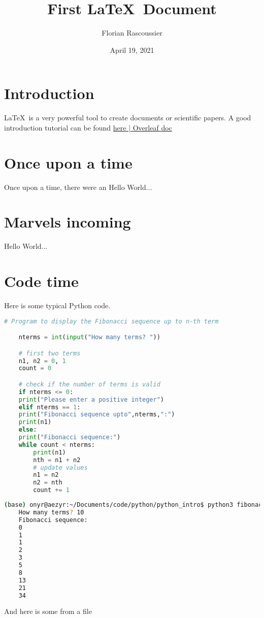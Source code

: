 \documentclass[a4paper, 12pt, oneside]{article}
\title{First \LaTeX\ Document }
\author{Florian Rascoussier}
\date{April 19, 2021}
\begin{document}
    \maketitle

    \section{Introduction}
    \LaTeX\ is a very powerful tool to create documents or scientific
    papers. A good introduction tutorial can be found 
    \href{https://www.overleaf.com/learn/latex/Main_Page}{here | Overleaf doc}

    \section{Once upon a time}
    Once upon a time, there were an Hello World...

\begin{comment}
    This is a multiline comment 
    Useful to, for instance, comment out 
    slow-rendering parts
    while working on a draft.
\end{comment}

    \section{Marvels incoming}
    Hello World...

    \section{Code time}
    Here is some typical Python code.

    \begin{lstlisting}[language=Python, caption=Python example, frame=single]
    # Program to display the Fibonacci sequence up to n-th term

    nterms = int(input("How many terms? "))

    # first two terms
    n1, n2 = 0, 1
    count = 0

    # check if the number of terms is valid
    if nterms <= 0:
    print("Please enter a positive integer")
    elif nterms == 1:
    print("Fibonacci sequence upto",nterms,":")
    print(n1)
    else:
    print("Fibonacci sequence:")
    while count < nterms:
        print(n1)
        nth = n1 + n2
        # update values
        n1 = n2
        n2 = nth
        count += 1
    \end{lstlisting}
    
    \begin{lstlisting}[language=bash, caption=Python example output, frame=single]
    (base) onyr@aezyr:~/Documents/code/python/python_intro$ python3 fibonacci_sequence.py 
    How many terms? 10
    Fibonacci sequence:
    0
    1
    1
    2
    3
    5
    8
    13
    21
    34
    \end{lstlisting}

    And here is some from a file 

    
\end{document}
